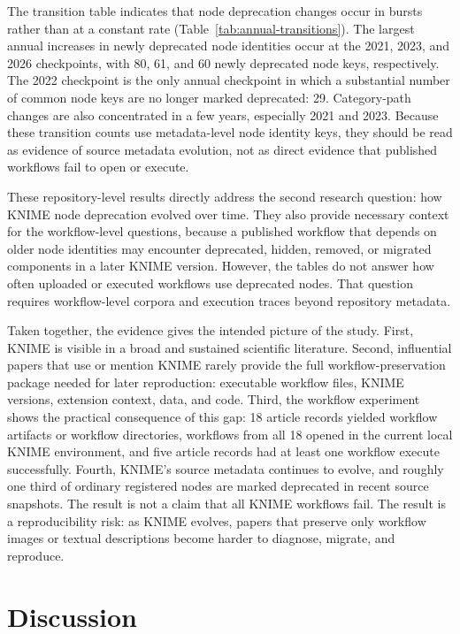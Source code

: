 \documentclass[runningheads]{llncs}
\begin{document}
The transition table indicates that node deprecation changes occur in bursts
rather than at a constant rate (Table~\ref{tab:annual-transitions}). The largest
annual increases in newly deprecated node identities occur at the 2021, 2023,
and 2026 checkpoints, with 80, 61, and 60 newly deprecated node keys,
respectively. The 2022 checkpoint is the only annual checkpoint in which a
substantial number of common node keys are no longer marked deprecated: 29.
Category-path changes are also concentrated in a few years, especially 2021
and 2023. Because these transition counts use metadata-level node identity keys,
they should be read as evidence of source metadata evolution, not as direct
evidence that published workflows fail to open or execute.

These repository-level results directly address the second research question:
how KNIME node deprecation evolved over time. They also provide necessary
context for the workflow-level questions, because a published workflow that
depends on older node identities may encounter deprecated, hidden, removed, or
migrated components in a later KNIME version. However, the tables do not answer
how often uploaded or executed workflows use deprecated nodes. That question
requires workflow-level corpora and execution traces beyond repository
metadata.

Taken together, the evidence gives the intended picture of the study. First,
KNIME is visible in a broad and sustained scientific literature. Second,
influential papers that use or mention KNIME rarely provide the full
workflow-preservation package needed for later reproduction: executable
workflow files, KNIME versions, extension context, data, and code. Third, the
workflow experiment shows the practical consequence of this gap: 18 article
records yielded workflow artifacts or workflow directories, workflows from all
18 opened in the current local KNIME environment, and five article records had
at least one workflow execute successfully. Fourth, KNIME's source metadata
continues to evolve, and roughly one third of ordinary registered nodes are
marked deprecated in recent source snapshots. The result is not a claim that
all KNIME workflows fail. The result is a reproducibility risk: as KNIME
evolves, papers that preserve only workflow images or textual descriptions
become harder to diagnose, migrate, and reproduce.

\section{Discussion}
\end{document}
